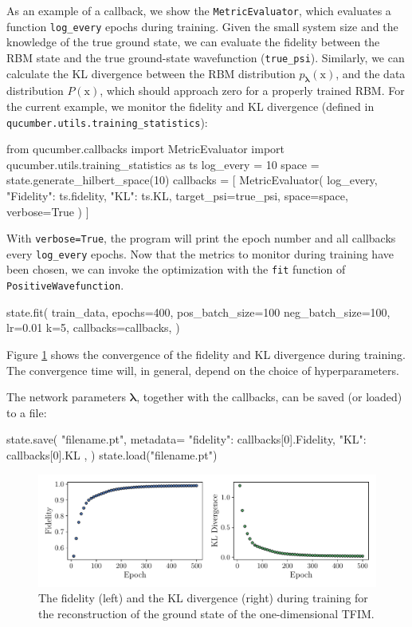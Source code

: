 \documentclass[submission, Phys, hidelnks]{SciPost}
\newcommand{\x}{\bm{\mathrm{x}}}
\begin{document}
As an example of a callback, we show the \verb|MetricEvaluator|, which evaluates a function \verb|log_every| epochs during training. 
Given the small system size and the knowledge of the true ground state, we can evaluate the fidelity between the RBM state and the true ground-state wavefunction (\verb|true_psi|). 
Similarly, we can calculate the KL divergence between the RBM distribution $p_{\bm{\lambda}}(\x)$, and the data distribution $P(\x)$, which should approach zero for a properly trained RBM. 
For the current example, we monitor the fidelity and KL divergence (defined in \verb|qucumber.utils.training_statistics|):
\begin{python}
from qucumber.callbacks import MetricEvaluator
import qucumber.utils.training_statistics as ts
log_every = 10
space = state.generate_hilbert_space(10)
callbacks = [
    MetricEvaluator(
        log_every,
        {"Fidelity": ts.fidelity, "KL": ts.KL},
    target_psi=true_psi,
    space=space,
    verbose=True
    )
]
\end{python}
With \verb|verbose=True|, the program will print the epoch number and all callbacks every \verb|log_every| epochs. Now that the metrics to monitor during training have been chosen, we can invoke the optimization with the \verb|fit| function of \verb|PositiveWavefunction|.
\begin{python}
state.fit(
    train_data,
    epochs=400,
    pos_batch_size=100
    neg_batch_size=100,
    lr=0.01
    k=5,
    callbacks=callbacks,
)
\end{python}

Figure \ref{fig:KL} shows the convergence of the fidelity and KL divergence during training. The convergence time will, in general, depend on the choice of hyperparameters.

The network parameters $\bm{\lambda}$, together with the callbacks, can be saved (or loaded) to a file:
\begin{python}
state.save(
    "filename.pt",
    metadata={
        "fidelity": callbacks[0].Fidelity,
        "KL": callbacks[0].KL
    },
)
state.load("filename.pt")
\end{python}

\begin{figure}[hbt]
    \centering{}
    \includegraphics[width=\columnwidth, trim={0 15 0 0}, clip]{fid_KL.pdf}
    \caption{\label{fig:KL} The fidelity (left) and the KL divergence (right) during training for the reconstruction of the ground state of the one-dimensional TFIM.}
\end{figure}
\end{document}
